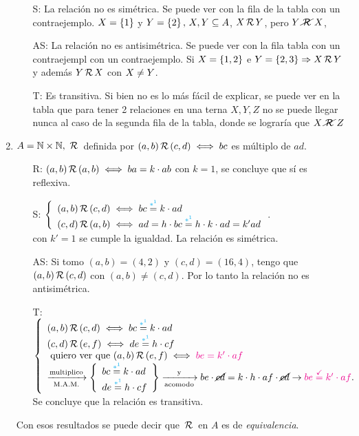 \documentclass[12pt,a4paper, spanish]{article}
\begin{document}
\begin{enumerate}[label=\roman*)]
\begin{enumerate}
		      \item[S:]
		            La relación no es simétrica. Se puede ver con la  fila de la tabla con un contraejemplo. $X = \set{1}$ y $Y = \set{2},\, X,Y \subseteq A$, $X \relacion Y$, pero $Y \norelacion X$,

		      \item[AS:]
		            La relación no es antisimétrica. Se puede ver con la  fila tabla con un contraejempl con un contraejemplo. Si $X = \set{1,2}$ e $Y = \set{2,3} \entonces X \relacion Y$ y además $Y \relacion X$
		            con  $X \distinto Y$.

		      \item[T:]
		            Es transitiva. Si bien no es lo más fácil de explicar, se puede ver en la tabla que para tener 2 relaciones
		            en una terna $X, Y, Z$ no se puede llegar nunca al caso de la segunda fila de la tabla, donde se lograría que
		            $X \norelacion Z$
	      \end{enumerate}

	\item $A = \naturales \times \naturales,\, \relacion$ definida por $(a,b) \relacion (c,d) \sisolosi bc$ es múltiplo de $ad$.
	      \begin{enumerate}
		      \item[R:] $(a,b) \relacion (a,b) \sisolosi ba = k\cdot ab$ con $k=1$, se concluye que sí es reflexiva.
		      \item[S:]
		            $ \llave{l}{
				            (a,b) \relacion (c,d) \sisolosi bc \llamadaI= k\cdot ad \\
				            (c,d) \relacion (a,b) \sisolosi ad = h\cdot bc \llamadaI= h\cdot k \cdot ad = k'ad
			            }$.\\
		            con  $k'=1$ se cumple la igualdad. La relación es simétrica.
		      \item[AS:] Si tomo $(a, b) = (4, 2)$ y $(c,d) = (16, 4)$, tengo que $(a,b) \relacion (c,d)$ con $(a,b) \neq (c,d)$. Por lo tanto
		            la relación no es antisimétrica.
		      \item[T:]$
			            \llave{l}{
				            (a,b) \relacion (c,d) \sisolosi bc \llamadaI= k\cdot ad \\
				            (c,d) \relacion (e,f) \sisolosi de \llamadaI= h\cdot cf \\
				            \qvq (a,b) \relacion (e,f) \sisolosi \magenta{$be = k'\cdot af$}\\
				            \flecha{multiplico}[M.A.M.]
				            \llaves{l}
				            {
					            bc \llamadaI= k\cdot ad \\
					            de \llamadaI= h\cdot cf \\
				            } \flecha{y}[acomodo] be \cdot \cancel{cd} = k \cdot h \cdot af \cdot \cancel{cd} \to \magenta{$be \stackrel{\checkmark}= k' \cdot af$}.
			            }$\\
		            Se concluye que la relación es transitiva.
	      \end{enumerate}
	      Con esos resultados se puede decir que $\relacion$ en $A$ es de \textit{equivalencia}.


\end{enumerate}
\end{document}
